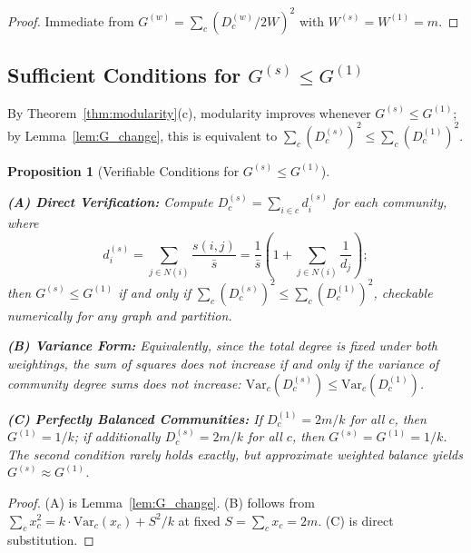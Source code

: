 \documentclass[10pt,journal,compsoc]{IEEEtran}
\newtheorem{proposition}{Proposition}
\begin{document}
\begin{proof}
Immediate from $G^{(w)} = \sum_c (D_c^{(w)}/2W)^2$ with $W^{(s)} = W^{(1)} = m$.
\end{proof}

\subsection{\texorpdfstring{Sufficient Conditions for $G^{(s)} \leq G^{(1)}$}{Sufficient Conditions for G(s) <= G(1)}}

By Theorem~\ref{thm:modularity}(c), modularity improves whenever $G^{(s)} \leq G^{(1)}$; by Lemma~\ref{lem:G_change}, this is equivalent to $\sum_c (D_c^{(s)})^2 \leq \sum_c (D_c^{(1)})^2$.

\begin{proposition}[Verifiable Conditions for $G^{(s)} \leq G^{(1)}$]
\label{prop:alternatives}

\textbf{(A) Direct Verification:} Compute $D_c^{(s)} = \sum_{i \in c} d_i^{(s)}$ for each community, where
\begin{equation}
d_i^{(s)} = \sum_{j \in N(i)} \frac{s(i,j)}{\bar{s}} = \frac{1}{\bar{s}}\left(1 + \sum_{j \in N(i)} \frac{1}{d_j}\right);
\end{equation}
then $G^{(s)} \leq G^{(1)}$ if and only if $\sum_{c} (D_c^{(s)})^2 \leq \sum_{c} (D_c^{(1)})^2$, checkable numerically for any graph and partition.

\textbf{(B) Variance Form:} Equivalently, since the total degree is fixed under both weightings, the sum of squares does not increase if and only if the variance of community degree sums does not increase: $\text{Var}_c(D_c^{(s)}) \leq \text{Var}_c(D_c^{(1)})$.

\textbf{(C) Perfectly Balanced Communities:} If $D_c^{(1)} = 2m/k$ for all $c$, then $G^{(1)} = 1/k$; if additionally $D_c^{(s)} = 2m/k$ for all $c$, then $G^{(s)} = G^{(1)} = 1/k$. The second condition rarely holds exactly, but approximate weighted balance yields $G^{(s)} \approx G^{(1)}$.
\end{proposition}

\begin{proof}
(A) is Lemma~\ref{lem:G_change}. (B) follows from $\sum_c x_c^2 = k \cdot \text{Var}_c(x_c) + S^2/k$ at fixed $S = \sum_c x_c = 2m$. (C) is direct substitution.
\end{proof}
\end{document}
